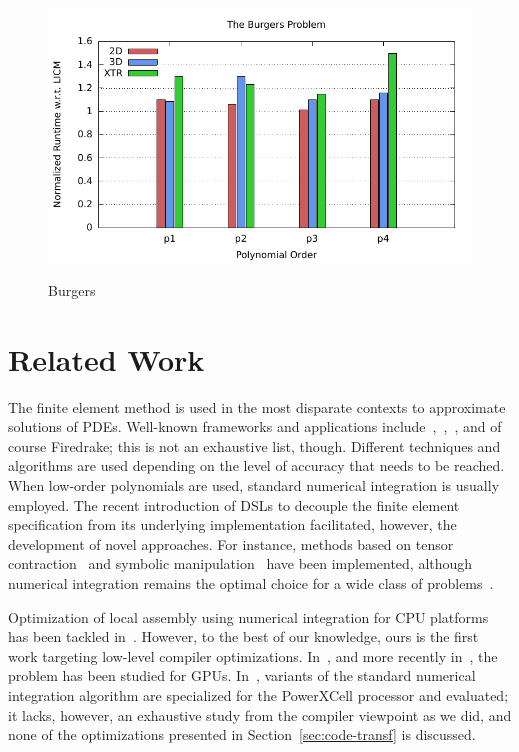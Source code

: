 \documentclass[conference]{IEEEtran}
\begin{document}
\begin{figure}[h]
\centerline{\includegraphics[scale=0.7]{Pictures/burgers-normalized.pdf}
\label{fig_first_case}}
\caption{Burgers}
\end{figure}


\section{Related Work}
\label{sec:related-work}
The finite element method is used in the most disparate contexts to approximate solutions of PDEs. Well-known frameworks and applications include~\cite{nek5000-web-page},~\cite{Fenics},~\cite{fluidity_manual_v4}, and of course Firedrake; this is not an exhaustive list, though. Different techniques and algorithms are used depending on the level of accuracy that needs to be reached. When low-order polynomials are used, standard numerical integration is usually employed. The recent introduction of DSLs to decouple the finite element specification from its underlying implementation facilitated, however, the development of novel approaches. For instance, methods based on tensor contraction~\cite{FFC-TC} and symbolic manipulation~\cite{Francis} have been implemented, although numerical integration remains the optimal choice for a wide class of problems~\cite{quadrature1}. 

Optimization of local assembly using numerical integration for CPU platforms has been tackled in~\cite{quadrature1}. However, to the best of our knowledge, ours is the first work targeting low-level compiler optimizations. In~\cite{Markall20101815}, and more recently in~\cite{petsc-integration-gpu}, the problem has been studied for GPUs. In~\cite{assembly-opencl}, variants of the standard numerical integration algorithm are specialized for the PowerXCell processor and evaluated; it lacks, however, an exhaustive study from the compiler viewpoint as we did, and none of the optimizations presented in Section~\ref{sec:code-transf} is discussed. 
\end{document}
